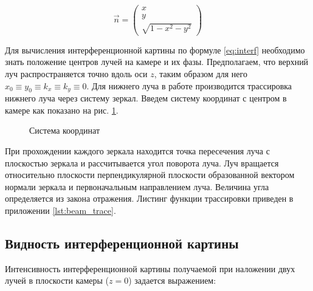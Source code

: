 \begin{equation}
    \vec{n} = \begin{pmatrix}
        x\\ 
        y\\ 
        \sqrt{1 - x^2 - y^2}
    \end{pmatrix}
\end{equation}


Для вычисления интерференционной картины по формуле \ref{eq:interf} необходимо знать положение центров лучей на камере и их фазы. Предполагаем, что верхний луч распространяется точно вдоль оси  $z$, таким образом для него $x_0\equiv y_0\equiv k_x\equiv k_y\equiv 0$. Для нижнего луча в работе производится трассировка нижнего луча через систему зеркал. Введем систему координат с центром в камере как показано на рис. \ref{fig:MZI_coordis}. 


\begin{figure}[ht]
\caption{Система координат}
\label{fig:MZI_coordis}
\end{figure}

При прохождении каждого зеркала находится точка пересечения луча с плоскостью зеркала и рассчитывается угол поворота луча. Луч вращается относительно плоскости перпендикулярной плоскости образованной вектором нормали зеркала и первоначальным направлением луча. Величина угла определяется из закона отражения. Листинг функции трассировки приведен в приложении \ref{lst:beam_trace}.


\subsection{Видность интерференционной картины}\label{sec:ch2/sec1/subsec3}

Интенсивность интерференционной картины получаемой при наложении двух лучей в плоскости камеры ($z=0$) задается выражением:

